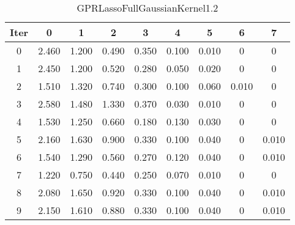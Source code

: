 \begin{table}
	\begin{center}
		\begin{tabular}{|c|c|c|c|c|c|c|c|c|}
			\hline
			Iter & 0 & 1 & 2 & 3 & 4 & 5 & 6 & 7 \\
			\hline
			0 & 2.460 & 1.200 & 0.490 & 0.350 & 0.100 & 0.010 & 0 & 0 \\
			\hline
			1 & 2.450 & 1.200 & 0.520 & 0.280 & 0.050 & 0.020 & 0 & 0 \\
			\hline
			2 & 1.510 & 1.320 & 0.740 & 0.300 & 0.100 & 0.060 & 0.010 & 0 \\
			\hline
			3 & 2.580 & 1.480 & 1.330 & 0.370 & 0.030 & 0.010 & 0 & 0 \\
			\hline
			4 & 1.530 & 1.250 & 0.660 & 0.180 & 0.130 & 0.030 & 0 & 0 \\
			\hline
			5 & 2.160 & 1.630 & 0.900 & 0.330 & 0.100 & 0.040 & 0 & 0.010 \\
			\hline
			6 & 1.540 & 1.290 & 0.560 & 0.270 & 0.120 & 0.040 & 0 & 0.010 \\
			\hline
			7 & 1.220 & 0.750 & 0.440 & 0.250 & 0.070 & 0.010 & 0 & 0 \\
			\hline
			8 & 2.080 & 1.650 & 0.920 & 0.330 & 0.100 & 0.040 & 0 & 0.010 \\
			\hline
			9 & 2.150 & 1.610 & 0.880 & 0.330 & 0.100 & 0.040 & 0 & 0.010 \\
			\hline
		\end{tabular}
	\end{center}
	\caption{GPRLassoFullGaussianKernel1.2}
\end{table}